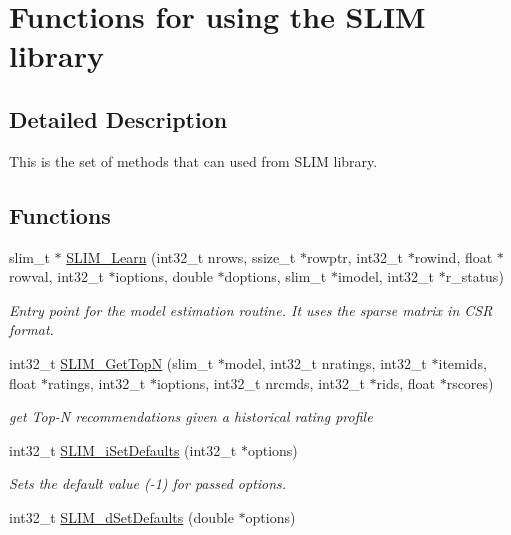 \hypertarget{group__slimapi}{}\section{Functions for using the S\+L\+IM library}
\label{group__slimapi}


\subsection{Detailed Description}
This is the set of methods that can used from S\+L\+IM library. \subsection*{Functions}
\begin{DoxyCompactItemize}
\item 
slim\+\_\+t $\ast$ \mbox{\hyperlink{group__slimapi_ga9c72d34ab6c2ba2b23d9d42ecee601ad}{S\+L\+I\+M\+\_\+\+Learn}} (int32\+\_\+t nrows, ssize\+\_\+t $\ast$rowptr, int32\+\_\+t $\ast$rowind, float $\ast$rowval, int32\+\_\+t $\ast$ioptions, double $\ast$doptions, slim\+\_\+t $\ast$imodel, int32\+\_\+t $\ast$r\+\_\+status)
\begin{DoxyCompactList}\small\item\em Entry point for the model estimation routine. It uses the sparse matrix in C\+SR format. \end{DoxyCompactList}\item 
int32\+\_\+t \mbox{\hyperlink{group__slimapi_gadfd1f913a1551b8368bb3fae0e822b11}{S\+L\+I\+M\+\_\+\+Get\+TopN}} (slim\+\_\+t $\ast$model, int32\+\_\+t nratings, int32\+\_\+t $\ast$itemids, float $\ast$ratings, int32\+\_\+t $\ast$ioptions, int32\+\_\+t nrcmds, int32\+\_\+t $\ast$rids, float $\ast$rscores)
\begin{DoxyCompactList}\small\item\em get Top-\/N recommendations given a historical rating profile \end{DoxyCompactList}\item 
int32\+\_\+t \mbox{\hyperlink{group__slimapi_ga1965cf3d8e4bb9dadbbea1d833f14cea}{S\+L\+I\+M\+\_\+i\+Set\+Defaults}} (int32\+\_\+t $\ast$options)
\begin{DoxyCompactList}\small\item\em Sets the default value (-\/1) for passed options. \end{DoxyCompactList}\item 
int32\+\_\+t \mbox{\hyperlink{group__slimapi_gabc2c211b672d060de71e4806b873608c}{S\+L\+I\+M\+\_\+d\+Set\+Defaults}} (double $\ast$options)

\end{DoxyCompactItemize}
